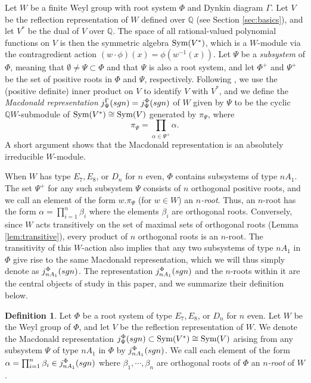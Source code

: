 \documentclass[11pt]{amsart}
\theoremstyle{plain}
\theoremstyle{definition}
\newtheorem{defn}[theorem]{Definition}
\theoremstyle{remark}
\numberwithin{equation}{subsection}
\newcommand{\al}{\alpha}
\newcommand{\be}{\beta}
\newcommand{\Q}{{\mathbb Q}}
\newcommand{\fh}{V}
\newcommand{\posroots}{\Phi^+}
\newcommand{\allroots}{\Phi}
\newcommand{\Sym}{\text{\rm Sym}}
\newcommand{\macd}[2]{j^{#1}_{#2}({\rm{sgn}})}
\begin{document}
Let $W$ be a finite Weyl group with root system $\allroots$ and Dynkin diagram
$\Gamma$. Let $\fh$ be the reflection representation of $W$ defined over $\Q$
(see Section \ref{sec:basics}), and let $\fh^*$ be the dual of $V$ over $\Q$.
The space of all rational-valued polynomial functions on $V$ is then the
symmetric algebra $\Sym(\fh^*)$, which is a $W$-module via the contragredient
action $(w\cdot\phi)(x) = \phi(w^{-1}(x))$.   Let $\Psi$ be a {\it subsystem} of
$\allroots$, meaning that $\emptyset \ne \Psi \subset \allroots$ and that $\Psi$
is also a root system, and let $\posroots$ and $\Psi^+$ be the set of positive
roots in $\allroots$ and $\Psi$, respectively. Following \cite{macdonald72}, we
use the (positive definite) inner product on $\fh$  to identify $\fh$ with
$\fh^*$, and we define the {\it Macdonald representation} $\macd{\Gamma}{\Psi} =
\macd{\allroots}{\Psi}$ of $W$ given by $\Psi$ to be the cyclic $\Q W$-submodule
of $\Sym(\fh^*)\cong \Sym(\fh)$ generated by $\pi_\Psi$, where $$ \pi_\Psi =
\prod_{\al \in \Psi^+} \al .$$ A short argument shows that the Macdonald
representation is an absolutely irreducible $W$-module.

When $W$ has type $E_7, E_8$, or $D_n$ for $n$ even, $\Phi$ contains subsystems
of type $nA_1$.  The set $\Psi^+$ for any such subsystem $\Psi$ consists of $n$
orthogonal positive roots, and we call an element of the form $w.\pi_\Psi$ (for
$w \in W$) an {\it $n$-root}. Thus, an $n$-root has the form $\al = \prod_{i =
1}^n \be_i$ where the elements $\be_i$ are orthogonal roots. Conversely, since
$W$ acts transitively on the set of maximal  sets of orthogonal roots (Lemma
\ref{lem:transitive}), every product of $n$ orthogonal roots is an $n$-root.
The transitivity of this $W$-action also implies that any two subsystems of type
$nA_1$ in $\Phi$ give rise to the same Macdonald representation, which we will
thus simply denote as $\macd{\Phi}{nA_1}$. The  representation
$\macd{\Phi}{nA_1}$ and the $n$-roots within it are the central objects of study
in this paper, and we summarize their definition below. 


\begin{defn}
    \label{def:mac}
    Let $\Phi$ be a root system of type $E_7, E_8$, or $D_n$ for $n$ even. Let
    $W$ be the Weyl group of $\Phi$, and let $V$ be the reflection
    representation of $W$. We denote the Macdonald representation
    $\macd{\allroots}{\Psi}\subset \Sym(\fh^*)\cong \Sym(\fh)$ arising from any
    subsystem $\Psi$ of type $nA_1$ in $\Phi$ by $\macd{\Phi}{nA_1}$. We call
    each element of the form $\al=\prod_{i=1}^n \be_i\in \macd{\Phi}{nA_1}$
    where $\be_1,\cdots,\be_n$ are orthogonal roots of $\Phi$ an \emph{$n$-root}
    of $W$. 
\end{defn}
\end{document}
